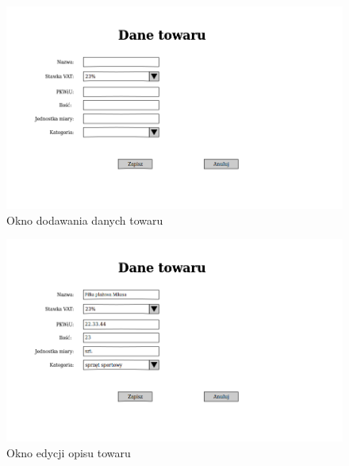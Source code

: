 \begin{figure}[!htb]
  \begin{center}
    \includegraphics[scale=0.45]{../img/interfejs/dodanie-danych-towaru.png}
  \end{center}
  \caption{Okno dodawania danych towaru}
\end{figure}
\FloatBarrier

\begin{figure}[!htb]
  \begin{center}
    \includegraphics[scale=0.45]{../img/interfejs/edycja-danych-towaru.png}
  \end{center}
  \caption{Okno edycji opisu towaru}
\end{figure}
\FloatBarrier

